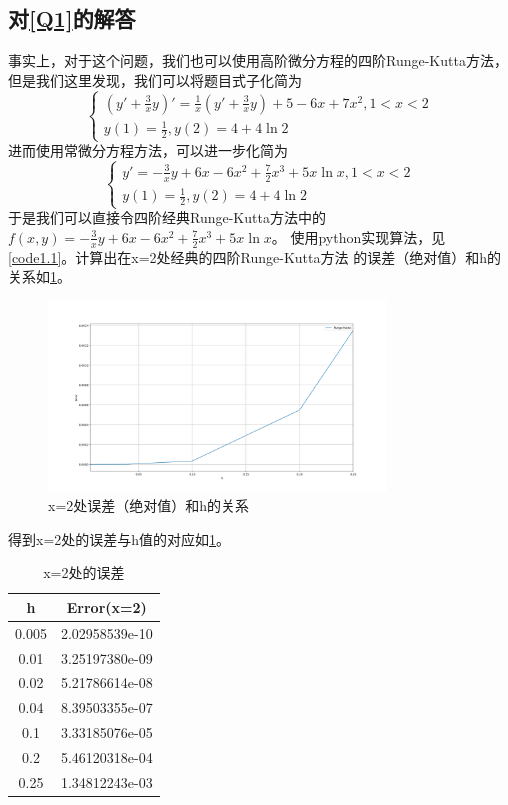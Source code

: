 \documentclass[a4paper,11pt,notitlepage]{article}
\begin{document}
\subsection{对\ref{Q1}的解答}
事实上，对于这个问题，我们也可以使用高阶微分方程的四阶Runge-Kutta方法，但是我们这里发现，我们可以将题目式子化简为
\[    
    \begin{cases}
            (y'+\frac{3}{x}y)'=\frac{1}{x}(y'+\frac{3}{x}y)+5-6x+7x^2,1<x<2\\
            y(1)=\frac{1}{2},y(2)=4+4\ln 2
    \end{cases}
\]
进而使用常微分方程方法，可以进一步化简为
\[\begin{cases}
    y'=-\frac{3}{x}y+6x-6x^2+\frac{7}{2}x^3+5x\ln x,1<x<2\\
    y(1)=\frac{1}{2},y(2)=4+4\ln 2
\end{cases}\]
\indent 于是我们可以直接令四阶经典Runge-Kutta方法中的$f(x,y)=-\frac{3}{x}y+6x-6x^2+\frac{7}{2}x^3+5x\ln x$。
使用python实现算法，见\cref{code1.1}。计算出在x=2处经典的四阶Runge-Kutta方法
的误差（绝对值）和h的关系如\cref{pic:1}。
\begin{figure}[H]
    \centering
    \includegraphics[width=0.8\textwidth]{../picture/Final exam.png}
    \caption{x=2处误差（绝对值）和h的关系}
    \label{pic:1}
\end{figure}
得到x=2处的误差与h值的对应如\cref{tab:1}。
\begin{table}[ht]
    \begin{center}
    \begin{tabular}{|c|c|}
        \hline
        h & Error(x=2) \\
        \hline
        0.005 & 2.02958539e-10 \\
        \hline
        0.01 & 3.25197380e-09 \\
        \hline
        0.02 & 5.21786614e-08 \\
        \hline
        0.04 & 8.39503355e-07 \\
        \hline
        0.1 & 3.33185076e-05\\
        \hline
        0.2& 5.46120318e-04\\
        \hline
        0.25&1.34812243e-03\\
        \hline
        \end{tabular}
        \caption{x=2处的误差}
        \label{tab:1}
    \end{center}
\end{table}
\end{document}
